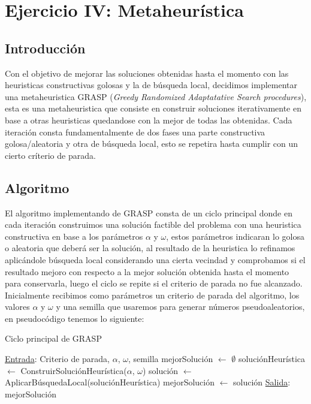 \section{Ejercicio IV: Metaheur\'istica}

\subsection{Introducci\'on}

Con el objetivo de mejorar las soluciones obtenidas hasta el momento con las heuristicas constructivas golosas y la de búsqueda local, decidimos implementar una metaheuristica GRASP (\textit{Greedy Randomized Adaptatative Search procedures}), esta es una metaheuristica que consiste en construir soluciones iterativamente en base a otras heuristicas quedandose con la mejor de todas las obtenidas. Cada iteración consta fundamentalmente de dos fases una parte constructiva golosa/aleatoria y otra de búsqueda local, esto se repetira hasta cumplir con un cierto críterio de parada.

\subsection{Algoritmo}

El algoritmo implementando de GRASP consta de un ciclo principal donde en cada iteración construimos una solución factible del problema con una heuristica constructiva en base a los parámetros $\alpha$ y $\omega$, estos parámetros indicaran lo golosa o aleatoria que deberá ser la solución, al resultado de la heuristica lo refinamos aplicándole búsqueda local considerando una cierta vecindad y comprobamos si el resultado mejoro con respecto a la mejor solución obtenida hasta el momento para conservarla, luego el ciclo se repite si el criterio de parada no fue alcanzado. Inicialmente recibimos como parámetros un criterio de parada del algoritmo, los valores $\alpha$ y $\omega$ y una semilla que usaremos para generar números pseudoaleatorios, en pseudocódigo tenemos lo siguiente:


\begin{algorithm}[H]

\label{}
\caption{Ciclo principal de GRASP}

\begin{algorithmic}[1]

\Statex \underline{Entrada}: Criterio de parada, $\alpha$, $\omega$, semilla
\medskip
\State mejorSoluci\'on $\gets$ $\emptyset$
    \State soluci\'onHeur\'istica $\gets$ ConstruirSoluci\'onHeur\'istica($\alpha$, $\omega$)
	\State soluci\'on $\gets$ AplicarB\'usquedaLocal(soluci\'onHeur\'istica)
		\State mejorSoluci\'on $\gets$ soluci\'on
	\EndIf
\EndWhile
\medskip
\Statex \underline{Salida}: mejorSoluci\'on

\end{algorithmic}
\end{algorithm}

